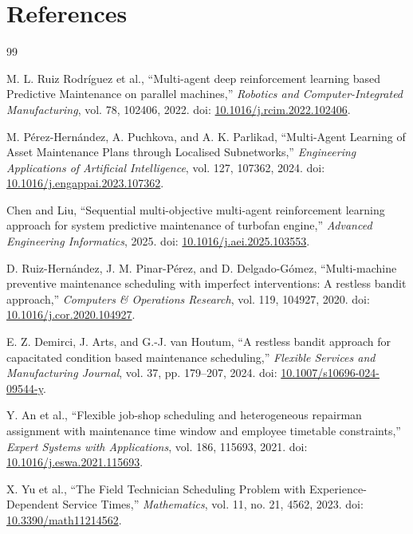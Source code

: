 \documentclass[11pt]{article}
\begin{document}
\section*{References}

\begin{thebibliography}{99}

M. L. Ruiz Rodríguez et al., ``Multi-agent deep reinforcement learning based Predictive Maintenance on parallel machines,'' \emph{Robotics and Computer-Integrated Manufacturing}, vol. 78, 102406, 2022. doi: \href{https://doi.org/10.1016/j.rcim.2022.102406}{10.1016/j.rcim.2022.102406}.

M. Pérez-Hernández, A. Puchkova, and A. K. Parlikad, ``Multi-Agent Learning of Asset Maintenance Plans through Localised Subnetworks,'' \emph{Engineering Applications of Artificial Intelligence}, vol. 127, 107362, 2024. doi: \href{https://doi.org/10.1016/j.engappai.2023.107362}{10.1016/j.engappai.2023.107362}.

Chen and Liu, ``Sequential multi-objective multi-agent reinforcement learning approach for system predictive maintenance of turbofan engine,'' \emph{Advanced Engineering Informatics}, 2025. doi: \href{https://doi.org/10.1016/j.aei.2025.103553}{10.1016/j.aei.2025.103553}.

D. Ruiz-Hernández, J. M. Pinar-Pérez, and D. Delgado-Gómez, ``Multi-machine preventive maintenance scheduling with imperfect interventions: A restless bandit approach,'' \emph{Computers \& Operations Research}, vol. 119, 104927, 2020. doi: \href{https://doi.org/10.1016/j.cor.2020.104927}{10.1016/j.cor.2020.104927}.

E. Z. Demirci, J. Arts, and G.-J. van Houtum, ``A restless bandit approach for capacitated condition based maintenance scheduling,'' \emph{Flexible Services and Manufacturing Journal}, vol. 37, pp. 179--207, 2024. doi: \href{https://doi.org/10.1007/s10696-024-09544-y}{10.1007/s10696-024-09544-y}.

Y. An et al., ``Flexible job-shop scheduling and heterogeneous repairman assignment with maintenance time window and employee timetable constraints,'' \emph{Expert Systems with Applications}, vol. 186, 115693, 2021. doi: \href{https://doi.org/10.1016/j.eswa.2021.115693}{10.1016/j.eswa.2021.115693}.

X. Yu et al., ``The Field Technician Scheduling Problem with Experience-Dependent Service Times,'' \emph{Mathematics}, vol. 11, no. 21, 4562, 2023. doi: \href{https://doi.org/10.3390/math11214562}{10.3390/math11214562}.


\end{thebibliography}
\end{document}
